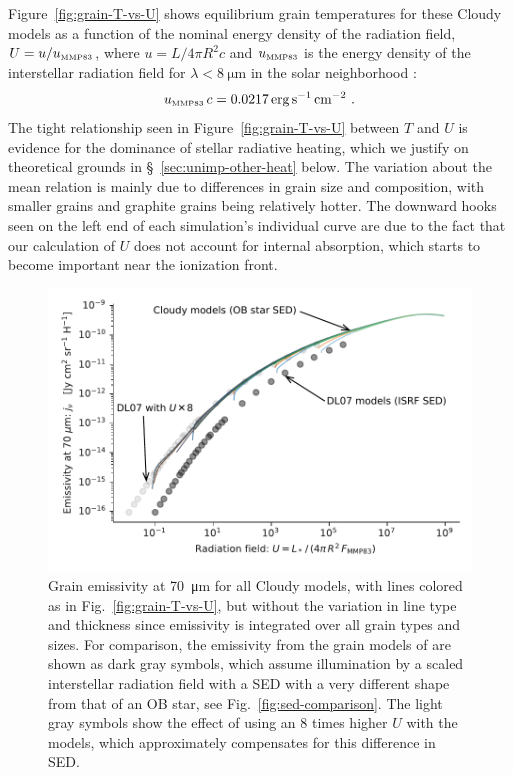Figure~\ref{fig:grain-T-vs-U} shows equilibrium grain temperatures for
these Cloudy models as a function of the nominal energy density of the
radiation field, \(U = u / u_{\text{\tiny MMP83}} \), where \(u = L / 4 \pi R^2 c\) and
\(u_{\text{\tiny MMP83}}\) is the energy density of the interstellar radiation field
for \(\lambda < \SI{8}{\um}\) in the solar neighborhood
\citep{Mathis:1983a}:
\begin{equation}
  \label{eq:u-mmp83}
  u_{\text{\tiny MMP83}}\,c = \SI{0.0217}{erg.s^{-1}.cm^{-2}} \ .
\end{equation}
The tight relationship seen in Figure~\ref{fig:grain-T-vs-U} between
\(T\) and \(U\) is evidence for the dominance of stellar radiative
heating, which we justify on theoretical grounds in
\S~\ref{sec:unimp-other-heat} below.  The variation about the mean
relation is mainly due to differences in grain size and composition,
with smaller grains and graphite grains being relatively hotter.  The
downward hooks seen on the left end of each simulation's individual
curve are due to the fact that our calculation of \(U\) does not
account for internal absorption, which starts to become important near
the ionization front.

\begin{figure}
  \centering
  \includegraphics[width=\linewidth]{figs/grain-j70-vs-U-edited}
  \caption{Grain emissivity at \SI{70}{\um} for all Cloudy models,
    with lines colored as in Fig.~\ref{fig:grain-T-vs-U}, but without
    the variation in line type and thickness since emissivity is
    integrated over all grain types and sizes.  For comparison, the
    emissivity from the grain models of \citet{Draine:2007a} are shown
    as dark gray symbols, which assume illumination by a scaled
    interstellar radiation field with a SED with a very different
    shape from that of an OB star, see Fig.~\ref{fig:sed-comparison}.
    The light gray symbols show the effect of using an 8 times higher
    \(U\) with the \citeauthor{Draine:2007a} models, which
    approximately compensates for this difference in SED.  }
  \label{fig:grain-j70}
\end{figure}

